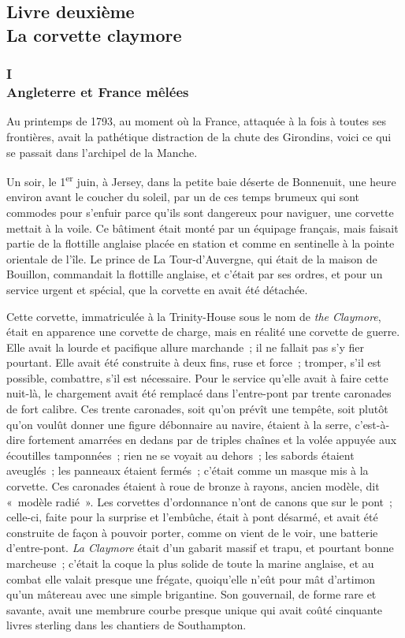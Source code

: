 \documentclass[french,twoside]{book} %
\begin{document}
 \subsection[{Livre deuxième. La corvette claymore}]{Livre deuxième \\
La corvette claymore}
\label{p1l2}
\subsubsection[{I. Angleterre et France mêlées}]{I \\
Angleterre et France mêlées}
\label{p1l2c1}
\noindent Au printemps de 1793, au moment où la France, attaquée à la fois à toutes ses frontières, avait la pathétique distraction de la chute des Girondins, voici ce qui se passait dans l’archipel de la Manche.\par
Un soir, le 1\textsuperscript{er} juin, à Jersey, dans la petite baie déserte de Bonnenuit, une heure environ avant le coucher du soleil, par un de ces temps brumeux qui sont commodes pour s’enfuir parce qu’ils sont dangereux pour naviguer, une corvette mettait à la voile. Ce bâtiment était monté par un équipage français, mais faisait partie de la flottille anglaise placée en station et comme en sentinelle à la pointe orientale de l’île. Le prince de La Tour-d’Auvergne, qui était de la maison de Bouillon, commandait la flottille anglaise,  et c’était par ses ordres, et pour un service urgent et spécial, que la corvette en avait été détachée.\par
Cette corvette, immatriculée à la Trinity-House sous le nom de \emph{the Claymore}, était en apparence une corvette de charge, mais en réalité une corvette de guerre. Elle avait la lourde et pacifique allure marchande ; il ne fallait pas s’y fier pourtant. Elle avait été construite à deux fins, ruse et force ; tromper, s’il est possible, combattre, s’il est nécessaire. Pour le service qu’elle avait à faire cette nuit-là, le chargement avait été remplacé dans l’entre-pont par trente caronades de fort calibre. Ces trente caronades, soit qu’on prévît une tempête, soit plutôt qu’on voulût donner une figure débonnaire au navire, étaient à la serre, c’est-à-dire fortement amarrées en dedans par de triples chaînes et la volée appuyée aux écoutilles tamponnées ; rien ne se voyait au dehors ; les sabords étaient aveuglés ; les panneaux étaient fermés ; c’était comme un masque mis à la corvette. Ces caronades étaient à roue de bronze à rayons, ancien modèle, dit « modèle radié ». Les corvettes d’ordonnance n’ont de canons que sur le pont ; celle-ci, faite pour la surprise et l’embûche, était à pont désarmé, et avait été construite de façon à pouvoir porter, comme on vient de le voir, une batterie d’entre-pont. \emph{La Claymore }était d’un gabarit massif et trapu, et pourtant bonne marcheuse ; c’était la coque la plus solide de toute la marine anglaise, et au combat elle valait presque une frégate, quoiqu’elle n’eût pour mât d’artimon qu’un mâtereau avec une simple brigantine. Son gouvernail,  de forme rare et savante, avait une membrure courbe presque unique qui avait coûté cinquante livres sterling dans les chantiers de Southampton.\par
\end{document}
